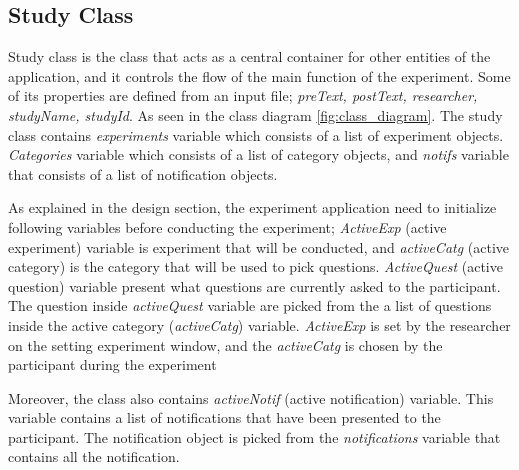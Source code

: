 \subsection{Study Class}
Study class is the class that acts as a central container for other entities of the application, and it controls the flow of the main function of the experiment.
Some of its properties are defined from an input file; \textit{preText, postText, researcher, studyName, studyId}.
As seen in the class diagram \ref{fig:class_diagram}. The study class contains \textit{experiments} variable which consists of a list of experiment objects.
 \textit{Categories} variable which consists of a list of category objects, and \textit{notifs} variable that consists of a list of notification objects.

As explained in the design section, the experiment application need to initialize following variables before conducting the experiment;
\textit{ActiveExp} (active experiment) variable is experiment that will be conducted, and \textit{activeCatg} (active category) is the
category that will be used to pick questions.
\textit{ActiveQuest} (active question) variable present what questions are currently asked to the participant.
The question inside \textit{activeQuest} variable are picked from the a list of questions inside the active category (\textit{activeCatg}) variable.
\textit{ActiveExp} is set by the researcher on the setting experiment window, and the \textit{activeCatg} is chosen by the participant during the experiment




Moreover, the class also contains \textit{activeNotif} (active notification) variable.
This variable contains a list of notifications that have been presented to the participant.
The notification object is picked from the \textit{notifications} variable that contains all the notification.

